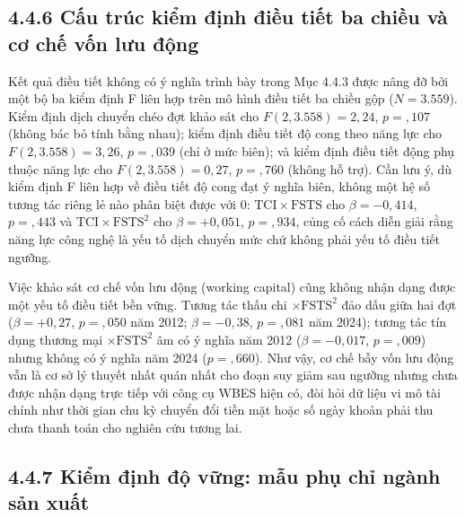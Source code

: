 \documentclass[
  a4paper,
  13pt]{extreport}
\begin{document}
\hypertarget{cux1ea5u-truxfac-kiux1ec3m-ux111ux1ecbnh-ux111iux1ec1u-tiux1ebft-ba-chiux1ec1u-vuxe0-cux1a1-chux1ebf-vux1ed1n-lux1b0u-ux111ux1ed9ng}{%
\subsection{4.4.6 Cấu trúc kiểm định điều tiết ba chiều và cơ chế vốn
lưu
động}\label{cux1ea5u-truxfac-kiux1ec3m-ux111ux1ecbnh-ux111iux1ec1u-tiux1ebft-ba-chiux1ec1u-vuxe0-cux1a1-chux1ebf-vux1ed1n-lux1b0u-ux111ux1ed9ng}}

Kết quả điều tiết không có ý nghĩa trình bày trong Mục 4.4.3 được nâng
đỡ bởi một bộ ba kiểm định F liên hợp trên mô hình điều tiết ba chiều
gộp (\(N = 3.559\)). Kiểm định dịch chuyển chéo đợt khảo sát cho
\(F(2, 3.558) = 2{,}24\), \(p = {,}107\) (không bác bỏ tính bằng nhau);
kiểm định điều tiết độ cong theo năng lực cho \(F(2, 3.558) = 3{,}26\),
\(p = {,}039\) (chỉ ở mức biên); và kiểm định điều tiết động phụ thuộc
năng lực cho \(F(2, 3.558) = 0{,}27\), \(p = {,}760\) (không hỗ trợ).
Cần lưu ý, dù kiểm định F liên hợp về điều tiết độ cong đạt ý nghĩa
biên, không một hệ số tương tác riêng lẻ nào phân biệt được với 0:
\(\text{TCI} \times \mathrm{FSTS}\) cho \(\beta = -0{,}414\),
\(p = {,}443\) và \(\text{TCI} \times \mathrm{FSTS}^2\) cho
\(\beta = +0{,}051\), \(p = {,}934\), củng cố cách diễn giải rằng năng
lực công nghệ là yếu tố dịch chuyển mức chứ không phải yếu tố điều tiết
ngưỡng.

Việc khảo sát cơ chế vốn lưu động (working capital) cũng không nhận dạng
được một yếu tố điều tiết bền vững. Tương tác thấu chi
\(\times \mathrm{FSTS}^2\) đảo dấu giữa hai đợt (\(\beta = +0{,}27\),
\(p = {,}050\) năm 2012; \(\beta = -0{,}38\), \(p = {,}081\) năm 2024);
tương tác tín dụng thương mại \(\times \mathrm{FSTS}^2\) âm có ý nghĩa
năm 2012 (\(\beta = -0{,}017\), \(p = {,}009\)) nhưng không có ý nghĩa
năm 2024 (\(p = {,}660\)). Như vậy, cơ chế bẫy vốn lưu động vẫn là cơ sở
lý thuyết nhất quán nhất cho đoạn suy giảm sau ngưỡng nhưng chưa được
nhận dạng trực tiếp với công cụ WBES hiện có, đòi hỏi dữ liệu vi mô tài
chính như thời gian chu kỳ chuyển đổi tiền mặt hoặc số ngày khoản phải
thu chưa thanh toán cho nghiên cứu tương lai.

\hypertarget{kiux1ec3m-ux111ux1ecbnh-ux111ux1ed9-vux1eefng-mux1eabu-phux1ee5-chux1ec9-nguxe0nh-sux1ea3n-xuux1ea5t}{%
\subsection{4.4.7 Kiểm định độ vững: mẫu phụ chỉ ngành sản
xuất}\label{kiux1ec3m-ux111ux1ecbnh-ux111ux1ed9-vux1eefng-mux1eabu-phux1ee5-chux1ec9-nguxe0nh-sux1ea3n-xuux1ea5t}}
\end{document}
